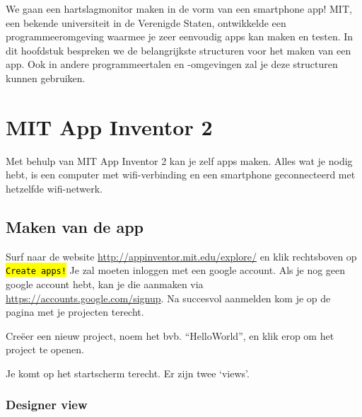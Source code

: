 
\begin{samenvatting}
We gaan een hartslagmonitor maken in de vorm van een smartphone app!
MIT, een bekende universiteit in de Verenigde Staten, ontwikkelde een programmeeromgeving waarmee je zeer eenvoudig apps kan maken en testen. In dit hoofdstuk bespreken we de belangrijkste structuren voor het maken van een app. Ook in andere programmeertalen en -omgevingen zal je deze structuren kunnen gebruiken.
\end{samenvatting}
%

\section{MIT App Inventor 2}
\label{sec:Mod2_Sec1}
%
Met behulp van MIT App Inventor 2 kan je zelf apps maken. Alles wat je nodig hebt, is een computer met wifi-verbinding en een smartphone geconnecteerd met hetzelfde wifi-netwerk.

\subsection{Maken van de app}

Surf naar de website \url{http://appinventor.mit.edu/explore/} en klik rechtsboven op \hl{\texttt{Create apps!}} Je zal moeten inloggen met een google account. Als je nog geen google account hebt, kan je die aanmaken via \url{https://accounts.google.com/signup}. Na succesvol aanmelden kom je op de pagina met je projecten terecht. 

Cre\"eer een nieuw project, noem het bvb. \textquotedblleft HelloWorld\textquotedblright, en klik erop om het project te openen. 

Je komt op het startscherm terecht. Er zijn twee \textquoteleft views\textquoteright. 

\subsubsection{Designer view}

